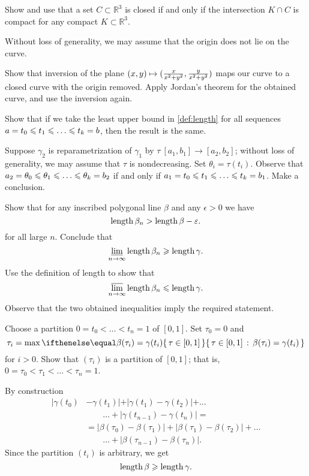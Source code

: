 \begin{multicols}{2}
Show and use that a set $C\subset \mathbb{R}^3$ is closed if and only if the intersection $K\cap C$ is compact for any compact $K\subset \mathbb{R}^3$.

Without loss of generality, we may assume that the origin does not lie on the curve.

Show that inversion of the plane $(x,y)\z\mapsto (\tfrac{x}{x^2+y^2},\tfrac{y}{x^2+y^2})$ maps our curve to a closed curve with the origin removed.
Apply Jordan's theorem for the obtained curve, and use the inversion again.


\setcounter{eqtn}{0}

Show that if we take the least upper bound in \ref{def:length} for all sequences
$a=t_0\le t_1\le\z\dots\le t_k=b$, then the result is the same.

Suppose $\gamma_2$ is reparametrization of $\gamma_1$ by $\tau\:[a_1,b_1]\to [a_2,b_2]$;
without loss of generality, we may assume that $\tau$ is nondecreasing.
Set $\theta_i=\tau(t_i)$.
Observe that $a_2=\theta_0\z\le\theta_1\le \z\dots\le\theta_k=b_2$ if and only if 
$a_1=t_0\le t_1\le\z\dots\le t_k=b_1$.
Make a conclusion.

Show that for any inscribed polygonal line $\beta$ and any $\epsilon>0$ we have
\[\mathop{\rm length}\nolimits\beta_n>\mathop{\rm length}\nolimits\beta-\varepsilon.\]
for all large $n$.
Conclude that
\[\varliminf_{n\to\infty}\mathop{\rm length}\nolimits\beta_n\geqslant \mathop{\rm length}\nolimits \gamma.\]
Use the definition of length to show that 
\[\varlimsup_{n\to\infty}\mathop{\rm length}\nolimits\beta_n\leqslant \mathop{\rm length}\nolimits \gamma.\]
Observe that the two obtained inequalities imply the required statement.

Choose a partition $0=t_0<\dots <t_n=1$ of $[0,1]$.
Set $\tau_0=0$ and 
\[\tau_i=\max\set{\tau \in[0,1]}{\beta(\tau_i)=\gamma(t_i)}\]
for $i>0$.
Show that $(\tau_i)$ is a partition of $[0,1]$;
that is, $0=\tau_0<\tau_1<\dots<\tau_n=1$.

By construction 
\begin{align*}
|\gamma(t_0)&-\gamma(t_1)|+|\gamma(t_1)-\gamma(t_2)|+\dots
\\
&\qquad\dots+|\gamma(t_{n-1})-\gamma(t_n)|=
\\
&=
|\beta(\tau_0)-\beta(\tau_1)|+|\beta(\tau_1)-\beta(\tau_2)|+\dots
\\
&\qquad\dots+|\beta(\tau_{n-1})-\beta(\tau_n)|.
\end{align*}
Since the partition $(t_i)$ is arbitrary, we get 
\[\mathop{\rm length}\nolimits \beta\geqslant \mathop{\rm length}\nolimits \gamma.\]


\end{multicols}
